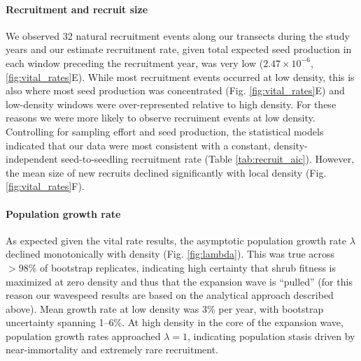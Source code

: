 \documentclass[11pt]{article}\usepackage[]{graphicx}\usepackage[usenames,dvipsnames]{xcolor}
\begin{document}
\paragraph{Recruitment and recruit size}
We observed 32 natural recruitment events along our transects during the study years and our estimate recruitment rate, given total expected seed production in each window preceding the recruitment year, was very low ($2.47 \times 10^{-6}$, \ref{fig:vital_rates}E). 
While most recruitment events occurred at low density, this is also where most seed production was concentrated (Fig. \ref{fig:vital_rates}E) and low-density windows were over-represented relative to high density. 
For these reasons we were more likely to observe recruiment events at low density. 
Controlling for sampling effort and seed production, the statistical models indicated that our data were most consistent with a constant, density-independent seed-to-seedling recruitment rate (Table \ref{tab:recruit_aic}). 
However, the mean size of new recruits declined significantly with local density (Fig. \ref{fig:vital_rates}F).


\paragraph{Population growth rate}
As expected given the vital rate results, the asymptotic population growth rate $\lambda$ declined monotonically with density (Fig. \ref{fig:lambda}). 
This was true across $>98\%$ of bootstrap replicates, indicating high certainty that shrub fitness is maximized at zero density and thus that the expansion wave is ``pulled'' (for this reason our wavespeed results are based on the analytical approach described above). 
Mean growth rate at low density was 3\% per year, with bootstrap uncertainty spanning 1--6\%.
At high density in the core of the expansion wave, population growth rates approached $\lambda=1$, indicating population stasis driven by near-immortality and extremely rare recruitment. 
\end{document}
